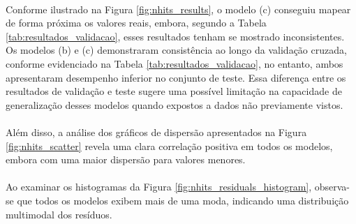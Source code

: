 \paragraph{} Conforme ilustrado na Figura \ref{fig:nhits_results}, o modelo (c) conseguiu mapear de forma próxima os valores reais, embora, segundo a Tabela \ref{tab:resultados_validacao}, esses resultados tenham se mostrado inconsistentes. Os modelos (b) e (c) demonstraram consistência ao longo da validação cruzada, conforme evidenciado na Tabela \ref{tab:resultados_validacao}, no entanto, ambos apresentaram desempenho inferior no conjunto de teste. Essa diferença entre os resultados de validação e teste sugere uma possível limitação na capacidade de generalização desses modelos quando expostos a dados não previamente vistos.
\paragraph{} Além disso, a análise dos gráficos de dispersão apresentados na Figura \ref{fig:nhits_scatter} revela uma clara correlação positiva em todos os modelos, embora com uma maior dispersão para valores menores.
\paragraph{} Ao examinar os histogramas da Figura \ref{fig:nhits_residuals_histogram}, observa-se que todos os modelos exibem mais de uma moda, indicando uma distribuição multimodal dos resíduos.


